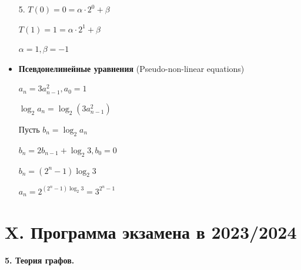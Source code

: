 \documentclass[12pt]{article}
\begin{document}
\begin{itemize}
        5. $T(0) = 0 = \alpha \cdot 2^0 + \beta$

        $T(1) = 1 = \alpha \cdot 2^1 + \beta$

        $\alpha = 1, \beta = -1$

        \vspace{5mm}

        \item \textbf{Псевдонелинейные уравнения} (Pseudo-non-linear equations)

        \Ex $a_n = 3a_{n - 1}^2, a_0 = 1$

        $\log_2 a_n = \log_2 (3a_{n - 1}^2)$

        Пусть $b_n = \log_2 a_n$

        $b_n = 2b_{n - 1} + \log_2 3, b_0 = 0$

        $b_n = (2^n - 1)\log_2 3$

        $a_n = 2^{(2^n - 1)\log_2 3} = 3^{2^n - 1}$

    \end{itemize}


    \clearpage


    \section{X. Программа экзамена в 2023/2024}


    \begin{center}
        \textbf{5. Теория графов.}
    \end{center}
\end{document}
